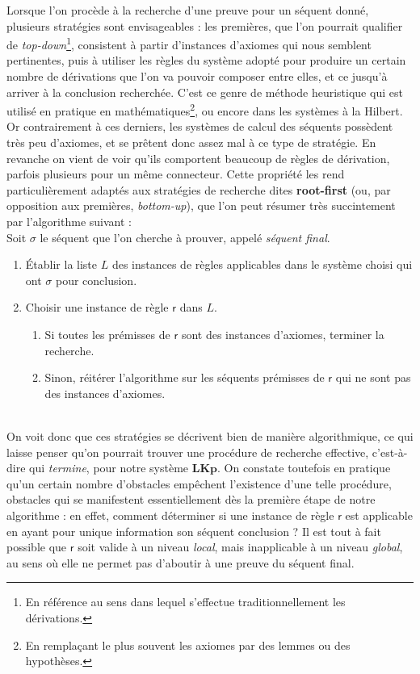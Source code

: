 \documentclass[12pt]{report}
\begin{document}
Lorsque l'on procède à la recherche d'une preuve pour un séquent donné, plusieurs stratégies sont envisageables : les premières, que l'on pourrait qualifier de \emph{top-down}\footnote{En référence au sens dans lequel s'effectue traditionnellement les dérivations.}, consistent à partir d'instances d'axiomes qui nous semblent pertinentes, puis à utiliser les règles du système adopté pour produire un certain nombre de dérivations que l'on va pouvoir composer entre elles, et ce jusqu'à arriver à la conclusion recherchée. C'est ce genre de méthode heuristique qui est utilisé en pratique en mathématiques\footnote{En remplaçant le plus souvent les axiomes par des lemmes ou des hypothèses.}, ou encore dans les systèmes à la Hilbert. Or contrairement à ces derniers, les systèmes de calcul des séquents possèdent très peu d'axiomes, et se prêtent donc assez mal à ce type de stratégie. En revanche on vient de voir qu'ils comportent beaucoup de règles de dérivation, parfois plusieurs pour un même connecteur. Cette propriété les rend particulièrement adaptés aux stratégies de recherche dites \textbf{root-first} (ou, par opposition aux premières, \emph{bottom-up}), que l'on peut résumer très succintement par l'algorithme suivant :\\

Soit $\sigma$ le séquent que l'on cherche à prouver, appelé \emph{séquent final}.
\begin{enumerate}
    \item Établir la liste $L$ des instances de règles applicables dans le système choisi qui ont $\sigma$ pour conclusion.
    \item Choisir une instance de règle $\mathsf{r}$ dans $L$.
        \begin{enumerate}
            \item Si toutes les prémisses de $\mathsf{r}$ sont des instances d'axiomes, terminer la recherche.
            \item Sinon, réitérer l'algorithme sur les séquents prémisses de $\mathsf{r}$ qui ne sont pas des instances d'axiomes.
        \end{enumerate}
\end{enumerate}
~\\
On voit donc que ces stratégies se décrivent bien de manière algorithmique, ce qui laisse penser qu'on pourrait trouver une procédure de recherche effective, c'est-à-dire qui \emph{termine}, pour notre système $\mathbf{LKp}$. On constate toutefois en pratique qu'un certain nombre d'obstacles empêchent l'existence d'une telle procédure, obstacles qui se manifestent essentiellement dès la première étape de notre algorithme : en effet, comment déterminer si une instance de règle $\mathsf{r}$ est applicable en ayant pour unique information son séquent conclusion ? Il est tout à fait possible que $\mathsf{r}$ soit valide à un niveau \emph{local}, mais inapplicable à un niveau \emph{global}, au sens où elle ne permet pas d'aboutir à une preuve du séquent final.\\
\end{document}
